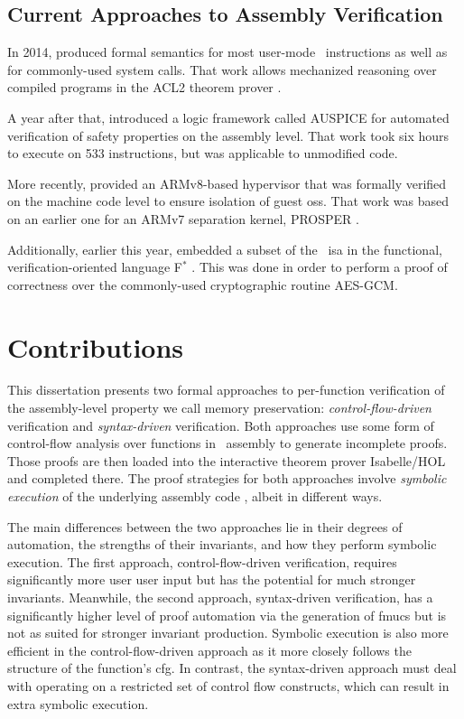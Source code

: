 \subsection{Current Approaches to Assembly Verification}
In 2014, \textcite{goel2014syscalls,goelphd} produced formal semantics
for most user-mode \arch\ instructions as well as for commonly-used system calls.
That work allows mechanized reasoning over compiled programs
in the ACL2 theorem prover \autocite{ACL2}.

A year after that, \textcite{tan2015auspice} introduced a logic framework called AUSPICE
for automated verification of safety properties on the assembly level.
That work took six hours to execute on \num{533} instructions,
but was applicable to unmodified code.

More recently, \textcite{baumann2016high} provided an ARMv8-based hypervisor
that was formally verified on the machine code level
to ensure isolation of guest \acp{os}.
That work was based on an earlier one for an ARMv7 separation kernel,
PROSPER \autocite{dam2013hypervisor,dam2013formal}.

Additionally, earlier this year, \textcite{fromherz2019verified} embedded a subset
of the \arch\ \ac{isa} in the functional, verification-oriented language
F$^*$ \autocite{fstar}.
This was done in order to perform a proof of correctness
over the commonly-used cryptographic routine AES-GCM.

\section{Contributions}
This dissertation presents two formal approaches to per-function verification
of the assembly-level property we call memory preservation:
\emph{control-flow-driven} verification and \emph{syntax-driven} verification.
Both approaches use some form of control-flow analysis over functions in \arch\ assembly
to generate incomplete proofs.
Those proofs are then loaded into the interactive theorem prover Isabelle/HOL
and completed there. The proof strategies for both approaches involve
\emph{symbolic execution} of the underlying assembly code \autocite{king1976symbolic},
albeit in different ways.

The main differences between the two approaches
lie in their degrees of automation, the strengths of their invariants,
and how they perform symbolic execution.
The first approach, control-flow-driven verification,
requires significantly more user user input but has the potential for much stronger invariants.
Meanwhile, the second approach, syntax-driven verification,
has a significantly higher level of proof automation via the generation of \acp{fmuc}
but is not as suited for stronger invariant production.
Symbolic execution is also more efficient in the control-flow-driven approach
as it more closely follows the structure of the function's \ac{cfg}.
In contrast, the syntax-driven approach must deal with
operating on a restricted set of control flow constructs,
which can result in extra symbolic execution.

